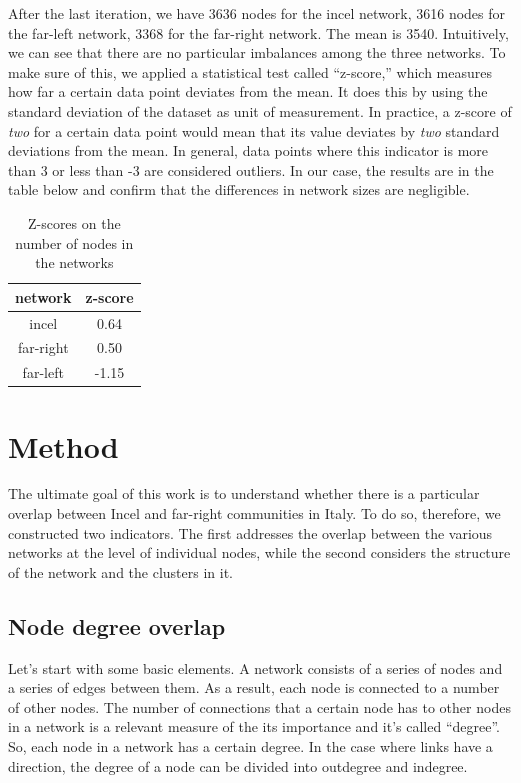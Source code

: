 \documentclass[a4paper,twoside,12pt, openany]{book}
\begin{document}
After the last iteration, we have 3636 nodes for the incel network, 3616 nodes for the far-left network, 3368 for the far-right network. The mean is 3540. Intuitively, we can see that there are no particular imbalances among the three networks. To make sure of this, we applied a statistical test called “z-score,” which measures how far a certain data point deviates from the mean. It does this by using the standard deviation of the dataset as unit of measurement. In practice, a z-score of \emph{two} for a certain data point would mean that its value deviates by \emph{two} standard deviations from the mean. In general, data points where this indicator is more than 3 or less than -3 are considered outliers. In our case, the results are in the table below and confirm that the differences in network sizes are negligible. \\

\renewcommand{\arraystretch}{1.5}
\setlength{\tabcolsep}{2em}
\begin{table}[h!]
	\centering
	\begin{tabular}{| c | c |}
		\hline
		\textbf{network} & \textbf{z-score} \\
		\hline
		incel & 0.64 \\
		\hline
		far-right & 0.50 \\
		\hline
		far-left & -1.15 \\
		\hline
	\end{tabular}
	\caption{Z-scores on the number of nodes in the networks}
\end{table}

\setlength{\tabcolsep}{6pt}

\chapter{Method}
The ultimate goal of this work is to understand whether there is a particular overlap between Incel and far-right communities in Italy. To do so, therefore, we constructed two indicators. The first addresses the overlap between the various networks at the level of individual nodes, while the second considers the structure of the network and the clusters in it.

\section{Node degree overlap}
\label{ch:node_overlap}
Let's start with some basic elements. A network consists of a series of nodes and a series of edges between them. As a result, each node is connected to a number of other nodes.  The number of connections that a certain node has to other nodes in a network is a relevant measure of the its importance and it's called “degree”. So, each node in a network has a certain degree. In the case where links have a direction, the degree of a node can be divided into outdegree and indegree.\\
\end{document}
